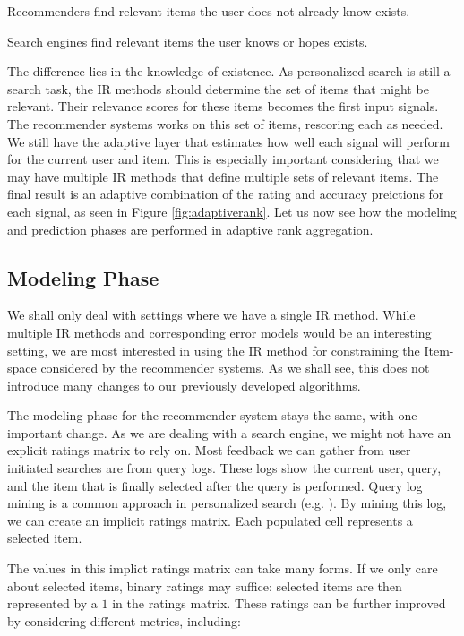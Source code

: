 \begin{itemize*}
  \item Recommenders find relevant items the user does not already know exists.
  \item Search engines find relevant items the user knows or hopes exists.
\end{itemize*}

The difference lies in the knowledge of existence.
As personalized search is still a search task, the IR methods should determine the set of items that might be relevant.
Their relevance scores for these items becomes the first input signals.
The recommender systems works on this set of items, rescoring each as needed.
We still have the adaptive layer that estimates how well each signal will perform for the current user and item.
This is especially important considering that we may have multiple IR methods that define multiple sets of relevant items.
The final result is an adaptive combination of the rating and accuracy preictions for each signal,
as seen in Figure \ref{fig:adaptiverank}.
Let us now see how the modeling and prediction phases are performed in adaptive rank aggregation.



\subsection{Modeling Phase}

We shall only deal with settings where we have a single IR method.
While multiple IR methods and corresponding error models would be an interesting
setting, we are most interested in using the IR method for constraining the Item-space considered by the recommender systems.
As we shall see, this does not introduce many changes to our previously developed algorithms.

The modeling phase for the recommender system stays the same, with one important change.
As we are dealing with a search engine, we might not have an explicit ratings matrix to rely on.
Most feedback we can gather from user initiated searches are from query logs.
These logs show the current user, query, and the item that is finally selected after the query is performed.
Query log mining is a common approach in personalized search
(e.g. \cite{Liu2002, Sugiyama2004, Shen2005, Speretta2000}).
By mining this log, we can create an implicit ratings matrix.
Each populated cell represents a selected item.

The values in this implict ratings matrix can take many forms.
If we only care about selected items, binary ratings may suffice:
selected items are then represented by a $1$ in the ratings matrix.
These ratings can be further improved by considering different metrics, including:

